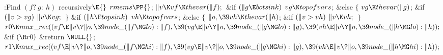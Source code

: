 \B{}:Find $(f{?}\ g{:}\ h)$ recursively\X${}\E{}$\6
$\\{rmems}\PP{}$;\6
${}\|v\K\\{vf}\K\\{thevar}(\|f);{}$\6
\&{if} ${}(\|g\E\\{botsink}){}$\1\5
${}\\{vg}\K\\{topofvars}{}$;\5
\2\&{else}\5
${}\{{}$\1\6
${}\\{vg}\K\\{thevar}(\|g){}$;\5
\&{if} ${}(\|v>\\{vg}){}$\1\5
${}\|v\K\\{vg};{}$\2\6
\4${}\}{}$\2\6
\&{if} ${}(\|h\E\\{topsink}){}$\1\5
${}\\{vh}\K\\{topofvars}{}$;\5
\2\&{else}\5
${}\{{}$\1\6
${}\|o,\39\\{vh}\K\\{thevar}(\|h){}$;\5
\&{if} ${}(\|v>\\{vh}){}$\1\5
${}\|v\K\\{vh};{}$\2\6
\4${}\}{}$\2\6
${}\\{r0}\K\\{mux\_rec}((\\{vf}\E\|v\?\|o,\39\\{node\_}(\|f\MG\\{lo}):\|f),\39(%
\\{vg}\E\|v\?\|o,\39\\{node\_}(\|g\MG\\{lo}):\|g),\39(\\{vh}\E\|v\?\|o,\39%
\\{node\_}(\|h\MG\\{lo}):\|h));{}$\6
\&{if} ${}(\R\\{r0}){}$\1\5
\&{return} ${}\NULL{}$;\2\6
${}\\{r1}\K\\{mux\_rec}((\\{vf}\E\|v\?\|o,\39\\{node\_}(\|f\MG\\{hi}):\|f),\39(%
\\{vg}\E\|v\?\|o,\39\\{node\_}(\|g\MG\\{hi}):\|g),\39(\\{vh}\E\|v\?\|o,\39%
\\{node\_}(\|h\MG\\{hi}):\|h));{}$\6
